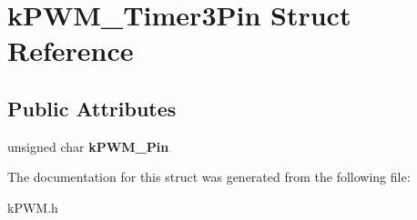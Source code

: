 \hypertarget{structkPWM__Timer3Pin}{}\section{k\+P\+W\+M\+\_\+\+Timer3\+Pin Struct Reference}
\label{structkPWM__Timer3Pin}
\subsection*{Public Attributes}
\begin{DoxyCompactItemize}
\item 
unsigned char {\bfseries k\+P\+W\+M\+\_\+\+Pin}\hypertarget{structkPWM__Timer3Pin_aef573defa6b76fd6b1004ff39dd9691f}{}\label{structkPWM__Timer3Pin_aef573defa6b76fd6b1004ff39dd9691f}

\end{DoxyCompactItemize}


The documentation for this struct was generated from the following file\+:\begin{DoxyCompactItemize}
\item 
k\+P\+W\+M.\+h\end{DoxyCompactItemize}
